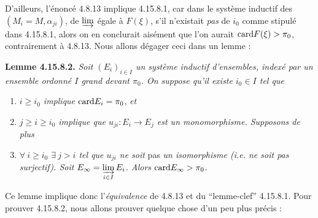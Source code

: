 D'ailleurs, l'énoncé 4.8.13 implique 4.15.8.1, car dans le système inductif des $(M_i = M, \alpha_{ji})$, de $\varinjlim$ égale à $F(\xi)$, s'il n'existait \textit{pas} de $i_0$ comme stipulé dans 4.15.8.1, alors on en conclurait aisément que l'on aurait $\mathrm{card} F(\xi) > \pi_0$, contrairement à 4.8.13. Nous allons dégager ceci dans un lemme :

\textbf{Lemme 4.15.8.2.} \textit{Soit $(E_i)_{i\in I}$ un système inductif d'ensembles, indexé par un ensemble ordonné $I$ grand devant $\pi_0$. On suppose qu'il existe $i_0 \in I$ tel que}
\begin{enumerate}[nosep]
\item[\textit{a)}] \textit{$i \geqslant i_0$ implique} $\mathrm{card} E_i = \pi_0$, \textit{et}
\item[\textit{b)}] \textit{$j \geqslant i \geqslant i_0$ implique que $u_{ji} : E_i \longrightarrow E_j$ est un monomorphisme. Supposons de plus}
\item[\textit{c)}] \textit{$\forall\ i \geqslant i_0$ $\exists\ j > i$ tel que $u_{ji}$ ne soit} pas \textit{un isomorphisme (i.e. ne soit pas surjectif). Soit $E_\infty = \varinjlim\limits_{i\in I} E_i$. Alors} $\mathrm{card} E_\infty > \pi_0$.
\end{enumerate}
Ce lemme implique donc l'\textit{équivalence} de 4.8.13 et du “lemme-clef” 4.15.8.1. Pour prouver 4.15.8.2, nous allons prouver quelque chose d'un peu plus précis :

